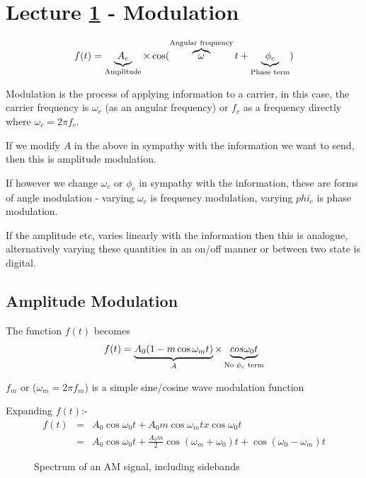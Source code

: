 \documentclass[11pt]{article} %
\begin{document}
\section{Lecture \ref{sec:lec1} - Modulation}
\label{sec:lec1}
\begin{equation}
	f(t) = \underbrace{A_c}_{\mbox{\scriptsize Amplitude}} \times \cos(\overbrace{\omega}^{\mbox{\scriptsize Angular frequency}} t + \underbrace{\phi _c}_{\mbox{\scriptsize Phase term}})
\end{equation}

Modulation is the process of applying information to a carrier, in this case, the carrier frequency is $\omega _c$ (as an angular frequency) or $f_c$ as a frequency directly where $\omega_c = 2 \pi f_c$.

If we modify $A$ in the above in sympathy with the information we want to send, then this is amplitude modulation.

If however we change $\omega_c$ or $\phi _c$ in sympathy with the information, these are forms of angle modulation - varying $\omega _c$ is frequency modulation, varying $phi _c$ is phase modulation.

If the amplitude etc, varies linearly with the information then this is analogue, alternatively varying these quantities in an on/off manner or between two state is digital.

\subsection{Amplitude Modulation}
The function $f(t)$ becomes
\begin{equation}
	f(t)=\underbrace{A_0(1-m \cos \omega_m t)}_{A} \times \underbrace{cos \omega _0 t}_{\mbox{\scriptsize No $\phi _c$ term}}
\label{eqn:am}
\end{equation}

$f_m$ or ($\omega_m = 2 \pi f_m$) is a simple sine/cosine wave modulation function

Expanding $f(t)$:-
\begin{eqnarray}
f(t) &=& A_0 \cos \omega_0t + A_0m \cos\omega_mt x \cos \omega_0 t \nonumber \\
&=& A_0 \cos\omega_0t+\frac{A_0m}{2} \cos(\omega_m+\omega_0)t+\cos(\omega_0-\omega_m)t
\end{eqnarray}
	\begin{figure}[h]
		\centering
		\caption{Spectrum of an AM signal, including sidebands}
	\end{figure}
\end{document}
